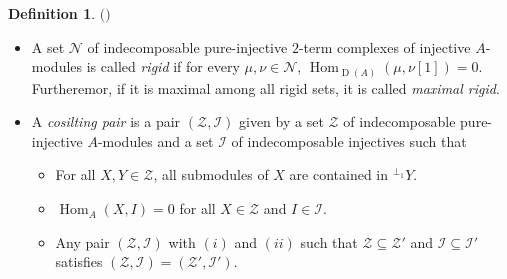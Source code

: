 \documentclass[12pt]{amsart}
\numberwithin{equation}{section}
\theoremstyle{definition}
\newtheorem{definition}[lemma]{Definition}
\DeclareMathOperator{\Hom}{Hom}
\DeclareMathOperator{\D}{D}
\newtheorem*{theorem 0*}{Theorem}
\newtheorem*{theorem a*}{Theorem A}
\newtheorem*{theorem b*}{Theorem B}
\numberwithin{diagram}{section}
\begin{document}
\begin{definition}$($\cite{ALS1}$)$\label{2.10}
\begin{itemize}
\item[(1)]
A set $\mathcal{N}$ of indecomposable pure-injective $2$-term complexes of injective $A$-modules is called {\it rigid} if for every $\mu,\nu\in\mathcal{N}$, $\Hom_{\D(A)}(\mu,\nu[1])=0$. Furtheremor, if it is maximal among all rigid sets, it is called {\it maximal rigid}.
\item[(2)]
A {\it cosilting pair} is a pair $(\mathcal{Z},\mathcal{I})$ given by a set $\mathcal{Z}$ of indecomposable pure-injective $A$-modules and a set $\mathcal{I}$ of indecomposable injectives such that
\begin{itemize}
\item[(i)]
For all $X,Y\in\mathcal{Z}$, all submodules of $X$ are contained in ${}^{\bot_1}Y$.
\item[(ii)]
$\Hom_A(X,I)=0$ for all $X\in\mathcal{Z}$ and $I\in\mathcal{I}$.
\item[(iii)]
Any pair $(\mathcal{Z},\mathcal{I})$ with $(i)$ and $(ii)$ such that $\mathcal{Z}\subseteq\mathcal{Z'}$ and $\mathcal{I}\subseteq\mathcal{I'}$ satisfies  $(\mathcal{Z},\mathcal{I})= (\mathcal{Z}',\mathcal{I}')$.
\end{itemize}
\end{itemize}
\end{definition}
\end{document}

